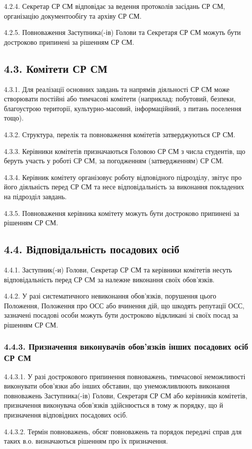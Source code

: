     4.2.4. Секретар СР СМ відповідає за ведення протоколів засідань СР СМ, організацію документообігу та архіву СР СМ.

    4.2.5. Повноваження Заступника(-ів) Голови та Секретаря СР СМ можуть бути достроково припинені за рішенням СР СМ.

\subsection*{4.3. Комітети СР СМ}
    4.3.1. Для реалізації основних завдань та напрямів діяльності СР СМ може створювати постійні або тимчасові комітети (наприклад: побутовий, безпеки, благоустрою території, культурно-масовий, інформаційний, з питань поселення тощо).

    4.3.2. Структура, перелік та повноваження комітетів затверджуються СР СМ.

    4.3.3. Керівники комітетів призначаються Головою СР СМ з числа студентів, що беруть участь у роботі СР СМ, за погодженням (затвердженням) СР СМ.

    4.3.4. Керівник комітету організовує роботу відповідного підрозділу, звітує про його діяльність перед СР СМ та несе відповідальність за виконання покладених на підрозділ завдань.

    4.3.5. Повноваження керівника комітету можуть бути достроково припинені за рішенням СР СМ.

\subsection*{4.4. Відповідальність посадових осіб}
    4.4.1. Заступник(-и) Голови, Секретар СР СМ та керівники комітетів несуть відповідальність перед СР СМ за належне виконання своїх обов'язків.

    4.4.2. У разі систематичного невиконання обов'язків, порушення цього Положення, Положення про ОСС або вчинення дій, що шкодять репутації ОСС, зазначені посадові особи можуть бути достроково відкликані зі своїх посад за рішенням СР СМ.

    \subsubsection*{4.4.3. Призначення виконувачів обов'язків інших посадових осіб СР СМ}
        4.4.3.1. У разі дострокового припинення повноважень, тимчасової неможливості виконувати обов'язки або інших обставин, що унеможливлюють виконання повноважень Заступника(-ів) Голови, Секретаря СР СМ або керівників комітетів, призначення виконувача обов'язків здійснюється в тому ж порядку, що й призначення відповідних посадових осіб.

        4.4.3.2. Термін повноважень, обсяг повноважень та порядок передачі справ для таких в.о. визначаються рішенням про їх призначення.
